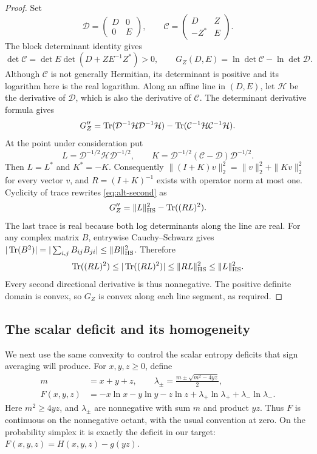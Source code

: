 \begin{proof}
Set
\[
 \mathcal D=\begin{pmatrix}D&0\\0&E\end{pmatrix},\qquad
 \mathcal C=\begin{pmatrix}D&Z\\-Z^*&E\end{pmatrix}.
\]
The block determinant identity gives
\[
 \det\mathcal C=\det E\det(D+ZE^{-1}Z^*)>0,
 \qquad G_Z(D,E)=\ln\det\mathcal C-\ln\det\mathcal D.
\]
Although $\mathcal C$ is not generally Hermitian, its determinant is
positive and its logarithm here is the real logarithm.
Along an affine line in $(D,E)$, let $\mathcal H$ be the derivative
of $\mathcal D$, which is also the derivative of $\mathcal C$.
The determinant derivative formula gives
\begin{equation}\label{eq:alt-second}
 G_Z''=\operatorname{Tr}(\mathcal D^{-1}\mathcal H\mathcal D^{-1}\mathcal H)
       -\operatorname{Tr}(\mathcal C^{-1}\mathcal H\mathcal C^{-1}\mathcal H).
\end{equation}
At the point under consideration put
\[
 L=\mathcal D^{-1/2}\mathcal H\mathcal D^{-1/2},\qquad
 K=\mathcal D^{-1/2}(\mathcal C-\mathcal D)\mathcal D^{-1/2}.
\]
Then $L=L^*$ and $K^*=-K$. Consequently
$\|(I+K)v\|_2^2=\|v\|_2^2+\|Kv\|_2^2$ for every vector $v$,
and $R=(I+K)^{-1}$ exists with operator norm at most one.
Cyclicity of trace rewrites \eqref{eq:alt-second} as
\[
 G_Z''=\|L\|_{\mathrm{HS}}^2-\operatorname{Tr}((RL)^2).
\]
The last trace is real because both log determinants along the line
are real. For any complex matrix $B$, entrywise Cauchy--Schwarz gives
$|\operatorname{Tr}(B^2)|=|\sum_{i,j}B_{ij}B_{ji}|\le\|B\|_{\mathrm{HS}}^2$.
Therefore
\[
 \operatorname{Tr}((RL)^2)\le|\operatorname{Tr}((RL)^2)|
 \le\|RL\|_{\mathrm{HS}}^2\le\|L\|_{\mathrm{HS}}^2.
\]
Every second directional derivative is thus nonnegative. The positive
definite domain is convex, so $G_Z$ is convex along each line segment,
as required.
\end{proof}

\subsection{The scalar deficit and its homogeneity}

We next use the same convexity to control the scalar entropy deficits
that sign averaging will produce. For $x,y,z\ge0$, define
\begin{align}
 m&=x+y+z,\qquad
 \lambda_\pm=\frac{m\pm\sqrt{m^2-4yz}}2,
 \label{eq:block-lambda}\\
 F(x,y,z)&=-x\ln x-y\ln y-z\ln z
           +\lambda_+\ln\lambda_++\lambda_-\ln\lambda_-.
 \label{eq:block-F}
\end{align}
Here $m^2\ge4yz$, and $\lambda_\pm$ are nonnegative with sum $m$
and product $yz$. Thus $F$ is continuous on the nonnegative octant,
with the usual convention at zero. On the probability simplex it is
exactly the deficit in our target: $F(x,y,z)=H(x,y,z)-g(yz)$.

